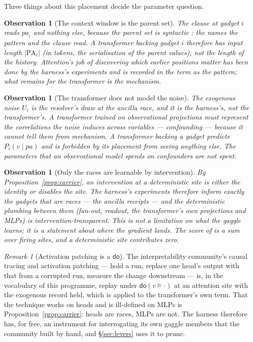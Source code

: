 \documentclass[11pt]{article}
\theoremstyle{plain}
\newtheorem{observation}[theorem]{Observation}
\theoremstyle{definition}
\theoremstyle{remark}
\newtheorem{remark}[theorem]{Remark}
\newcommand{\dok}{\textsf{do}}
\newcommand{\PA}{\mathrm{PA}}
\begin{document}
Three things about this placement decide the parameter question.

\begin{observation}[The context window is the parent set]\label{obs:context}
The clause at gadget $i$ reads $\mathit{pa}_i$ and nothing else, because the
parent set is syntactic \cite[\S1.2]{Interventions}: the names the pattern and
the clause read. A transformer backing gadget $i$ therefore has input length
$|\PA_i|$ (in tokens, the serialisation of the parent values), not the length of
the history. Attention's job of discovering which earlier positions matter has
been done by the harness's experiments and is recorded in the term as the
pattern; what remains for the transformer is the mechanism.
\end{observation}

\begin{observation}[The transformer does not model the noise]\label{obs:noise}
The exogenous noise $U_i$ is the resolver's draw at the ancilla race, and it is
the harness's, not the transformer's. A transformer trained on observational
projections must represent the correlations the noise induces across
variables --- confounding --- because it cannot tell them from mechanism. A
transformer backing a gadget predicts $P_i(v \mid \mathit{pa})$ and is
\emph{forbidden} by its placement from seeing anything else. The parameters that
an observational model spends on confounders are not spent.
\end{observation}

\begin{observation}[Only the races are learnable by intervention]\label{obs:races}
By Proposition~\ref{prop:carrier}, an intervention at a deterministic site is
either the identity or disables the site. The harness's experiments therefore
inform exactly the gadgets that are races --- the ancilla receipts --- and the
deterministic plumbing between them (fan-out, readout, the transformer's own
projections and MLPs) is intervention-transparent. This is not a limitation on
what the gaggle learns; it is a statement about where the gradient lands. The
score of \cite[Thm.~4.3]{GradedPLN} is a sum over firing sites, and a
deterministic site contributes zero.
\end{observation}

\begin{remark}[Activation patching is a $\dok$]
The interpretability community's causal tracing and activation patching ---
hold a run, replace one head's output with that from a corrupted run, measure the
change downstream --- is, in the vocabulary of this programme, replay under
$\dok(v \models \cdot)$ at an attention site with the exogenous record held,
which is \cite[Thm.~5.6]{Interventions} applied to the transformer's own term.
That the technique works on heads and is ill-defined on MLPs is
Proposition~\ref{prop:carrier}: heads are races, MLPs are not. The harness
therefore has, for free, an instrument for interrogating its own gaggle members
that the community built by hand, and \S\ref{sec:levers} uses it to prune.
\end{remark}
\end{document}
